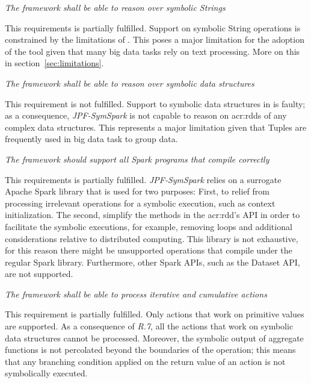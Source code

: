 \begin{itemize}
 \textit{The framework shall be able to reason over symbolic Strings}

This requirements is partially fulfilled. Support on symbolic String operations is constrained by the limitations of \spf{}. This poses a major limitation for the adoption of the tool given that many big data tasks rely on text processing. More on this in section~\ref{sec:limitations}.

 \textit{The framework shall be able to reason over symbolic data structures}

This requirement is not fulfilled. Support to symbolic data structures in \spf{} is faulty; as a consequence, \textit{JPF-SymSpark} is not capable to reason on \acrshort{acr:rdd}s of any complex data structures. This represents a major limitation given that Tuples are frequently used in big data task to group data.

 \textit{The framework should support all Spark programs that compile correctly}

This requirements is partially fulfilled. \textit{JPF-SymSpark} relies on a surrogate Apache Spark library that is used for two purposes: First, to relief \jpf{} from processing irrelevant operations for a symbolic execution, such as context initialization. The second, simplify the methods in the \acrshort{acr:rdd}'s API in order to facilitate the symbolic executions, for example, removing loops and additional considerations relative to distributed computing. This library is not exhaustive, for this reason there might be unsupported operations that compile under the regular Spark library. Furthermore, other Spark APIs, such as the Dataset API, are not supported.

 \textit{The framework shall be able to process iterative and cumulative actions}

This requirement is partially fulfilled. Only actions that work on primitive values are supported. As a consequence of \textit{R.7}, all the actions that work on symbolic data structures cannot be processed. Moreover, the symbolic output of aggregate functions is not percolated beyond the boundaries of the operation; this means that any branching condition applied on the return value of an action is not symbolically executed.
\end{itemize}

